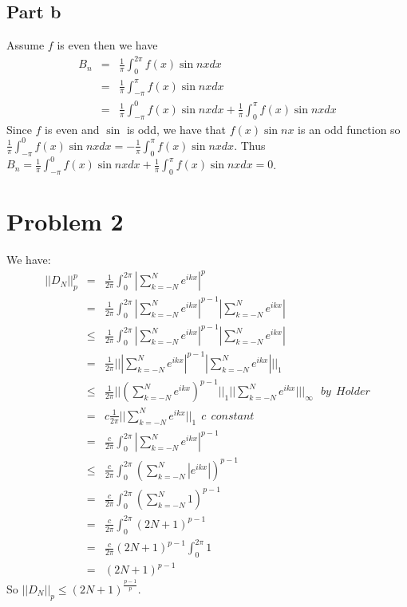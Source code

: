 \documentclass[12pt]{article}
\begin{document}
\subsection*{Part b}
Assume $f$ is even then we have
\begin{eqnarray*}
B_n &=& \frac{1}{\pi}\int_0^{2\pi} f(x) \sin nx dx \\ &=&
 \frac{1}{\pi}\int_{-\pi}^{\pi} f(x) \sin nx dx \\ &=&
  \frac{1}{\pi}\int_{-\pi}^{0} f(x) \sin nx dx  +
   \frac{1}{\pi}\int_{0}^{\pi} f(x) \sin nx dx 
\end{eqnarray*}
Since $f$ is even and $\sin $ is odd, we have that $f(x)\sin nx$ is an odd function so\\
$\frac{1}{\pi}\int_{-\pi}^{0} f(x) \sin nx dx=-\frac{1}{\pi}\int_{0}^{\pi} f(x) \sin nx dx$. Thus\\
$B_n= \frac{1}{\pi}\int_{-\pi}^{0} f(x) \sin nx dx  +
   \frac{1}{\pi}\int_{0}^{\pi} f(x) \sin nx dx =0$.
 
\clearpage
\section*{Problem 2}
We have:
\begin{eqnarray*}
||D_N||_p^p &=& \frac{1}{2\pi} \int_{0}^{2\pi} |\sum_{k=-N}^N e^{ikx}|^p \\ &=&
\frac{1}{2\pi} \int_{0}^{2\pi} |\sum_{k=-N}^N e^{ikx}|^{p-1}|\sum_{k=-N}^N e^{ikx}|
\\ &\le &
\frac{1}{2\pi} \int_{0}^{2\pi} |\sum_{k=-N}^N e^{ikx}|^{p-1}|\sum_{k=-N}^N e^{ikx}|
\\ &=&
\frac{1}{2\pi} || |\sum_{k=-N}^N e^{ikx}|^{p-1}|\sum_{k=-N}^N e^{ikx}|||_1
\\ &\le &
\frac{1}{2\pi}|| (\sum_{k=-N}^N e^{ikx})^{p-1}||_1 ||\sum_{k=-N}^N e^{ikx}|||_{\infty}
\ \ \  by  \  \  Holder
\\ &=&
c \frac{1}{2\pi} ||\sum_{k=-N}^N e^{ikx}||_1   \ \ c \ \ constant
\\ &=&
\frac{c}{2\pi} \int_{0}^{2\pi} |\sum_{k=-N}^N e^{ikx}|^{p-1} \\ &\le &
\frac{c}{2\pi} \int_{0}^{2\pi} (\sum_{k=-N}^N |e^{ikx}|)^{p-1} \\ &=&
\frac{c}{2\pi} \int_{0}^{2\pi} (\sum_{k=-N}^N 1)^{p-1} \\ &=&
\frac{c}{2\pi} \int_{0}^{2\pi} (2N+1)^{p-1} \\ &=&
\frac{c}{2\pi} (2N+1)^{p-1}\int_{0}^{2\pi} 1 \\ &=&
(2N+1)^{p-1}
\end{eqnarray*}
So $||D_N||_p \le (2N+1)^{\frac{p-1}{p}}$.
\end{document}
